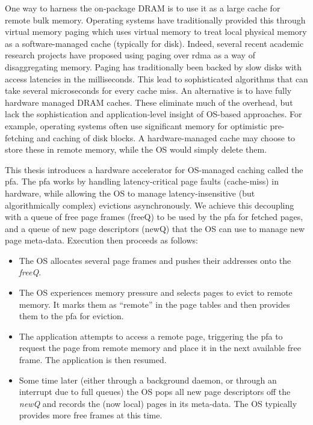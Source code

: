 One way to harness the on-package DRAM is to use it as a large cache for remote
bulk memory. Operating systems have traditionally provided this through virtual
memory \gls{paging} which uses virtual memory to treat local physical memory as
a software-managed cache (typically for disk). Indeed, several recent academic
research projects have proposed using paging over \gls{rdma} as a way of
disaggregating memory\cite{infiniswap}\cite{osdidisag}. Paging has
traditionally been backed by slow disks with access latencies in the
milliseconds. This lead to sophisticated algorithms that can take several
microseconds for every cache miss. An alternative is to have fully hardware
managed DRAM caches\cite{volos_DRAM}\cite{lee_tagless}. These eliminate much of
the overhead, but lack the sophistication and application-level insight of
OS-based approaches. For example, operating systems often use significant
memory for optimistic pre-fetching and caching of disk blocks. A
hardware-managed cache may choose to store these in remote memory, while the OS
would simply delete them.

This thesis introduces a hardware accelerator for OS-managed caching called the
\gls{pfa}. The \gls{pfa} works by handling latency-critical page faults
(cache-miss) in hardware, while allowing the OS to manage latency-insensitive
(but algorithmically complex) evictions asynchronously. We achieve this
decoupling with a queue of free page frames (freeQ) to be used by the \gls{pfa}
for fetched pages, and a queue of new page descriptors (newQ) that the OS can
use to manage new page meta-data. Execution then proceeds as follows:

\begin{itemize}
	 \item The OS allocates several page frames and pushes their addresses onto
		 the \emph{freeQ}.
   \item The OS experiences memory pressure and selects pages to evict to
		 remote memory. It marks them as ``remote'' in the page tables and then
     provides them to the \gls{pfa} for eviction.
   \item The application attempts to access a remote page, triggering the
     \gls{pfa}
		 to request the page from remote memory and place it in the next
		 available free frame. The application is then resumed.
	 \item Some time later (either through a background daemon, or through an
		 interrupt due to full queues) the OS pops all new page descriptors off
		 the \emph{newQ} and records the (now local) pages in its meta-data. The
		 OS typically provides more free frames at this time.
\end{itemize}


